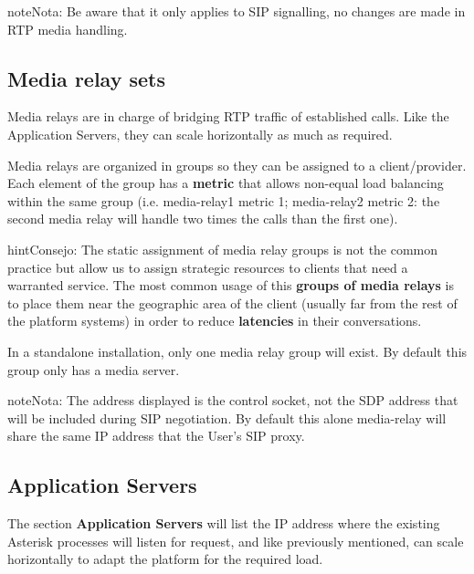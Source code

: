 \documentclass[letterpaper,10pt,spanish]{sphinxmanual}
\begin{document}
\begin{notice}{note}{Nota:}
Be aware that it only applies to SIP signalling, no changes are made in RTP media handling.
\end{notice}


\subsection{Media relay sets}
\label{administration_portal/platform/infrastructure/media_relay_sets::doc}\label{administration_portal/platform/infrastructure/media_relay_sets:media-relay-sets}
Media relays are in charge of bridging RTP traffic of established calls. Like
the Application Servers, they can scale horizontally as much as required.

Media relays are organized in groups so they can be assigned to a client/provider. Each
element of the group has a \textbf{metric} that allows non-equal load balancing
within the same group (i.e. media-relay1 metric 1; media-relay2 metric 2:
the second media relay will handle two times the calls than the first one).

\begin{notice}{hint}{Consejo:}
The static assignment of media relay groups is not the common practice
but allow us to assign strategic resources to clients that need a warranted
service. The most common usage of this \textbf{groups of media relays} is to
place them near the geographic area of the client (usually far from the
rest of the platform systems) in order to reduce \textbf{latencies} in their
conversations.
\end{notice}

In a standalone installation, only one media relay group will exist. By default this group only has a media server.

\begin{notice}{note}{Nota:}
The address displayed is the control socket, not the SDP address that
will be included during SIP negotiation. By default this alone media-relay
will share the same IP address that the User's SIP proxy.
\end{notice}


\subsection{Application Servers}
\label{administration_portal/platform/infrastructure/application_servers::doc}\label{administration_portal/platform/infrastructure/application_servers:application-servers}
The section \textbf{Application Servers} will list the IP address where the existing
Asterisk processes will listen for request, and like previously mentioned,
can scale horizontally to adapt the platform for the required load.
\end{document}

